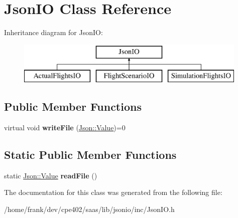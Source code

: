 \hypertarget{class_json_i_o}{}\section{Json\+I\+O Class Reference}
\label{class_json_i_o}
Inheritance diagram for Json\+I\+O\+:\begin{figure}[H]
\begin{center}
\leavevmode
\includegraphics[height=2.000000cm]{class_json_i_o}
\end{center}
\end{figure}
\subsection*{Public Member Functions}
\begin{DoxyCompactItemize}
\item 
\hypertarget{class_json_i_o_af6f8a61815323ac89752b5365fb2acab}{}virtual void {\bfseries write\+File} (\hyperlink{class_json_1_1_value}{Json\+::\+Value})=0\label{class_json_i_o_af6f8a61815323ac89752b5365fb2acab}

\end{DoxyCompactItemize}
\subsection*{Static Public Member Functions}
\begin{DoxyCompactItemize}
\item 
\hypertarget{class_json_i_o_a95a39d392f3f27bb94dc5ad5ef3dba19}{}static \hyperlink{class_json_1_1_value}{Json\+::\+Value} {\bfseries read\+File} ()\label{class_json_i_o_a95a39d392f3f27bb94dc5ad5ef3dba19}

\end{DoxyCompactItemize}


The documentation for this class was generated from the following file\+:\begin{DoxyCompactItemize}
\item 
/home/frank/dev/cpe402/saas/lib/jsonio/inc/Json\+I\+O.\+h\end{DoxyCompactItemize}
